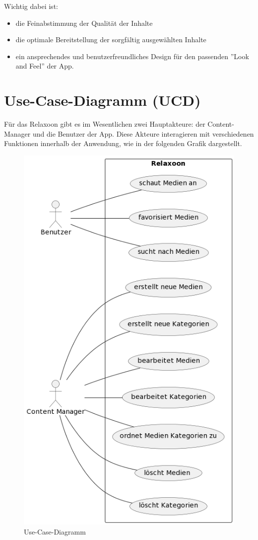 Wichtig dabei ist: 

\begin{itemize}
    \item die Feinabstimmung der Qualität der Inhalte
    \item die optimale Bereitstellung der sorgfältig ausgewählten Inhalte
    \item ein ansprechendes und benutzerfreundliches Design für den passenden ''Look and Feel'' der App.
\end{itemize}

\section{Use-Case-Diagramm (UCD)}

Für das Relaxoon gibt es im Wesentlichen zwei Hauptakteure: der Content-Manager und die Benutzer der 
App. Diese Akteure interagieren mit verschiedenen Funktionen innerhalb der Anwendung, wie in der folgenden Grafik 
dargestellt.

\begin{figure}[H]
    \centering
    \includegraphics[height=\textwidth]{./pics/ucd.png}
    \caption{Use-Case-Diagramm}
\end{figure}



